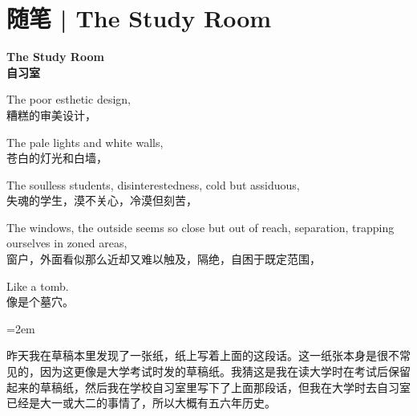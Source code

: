 \chapter{随笔 | The Study Room}






\parindent=0pt

\textbf{The Study Room\\
	自习室}

The poor esthetic design,\\
糟糕的审美设计，

The pale lights and white walls,\\
苍白的灯光和白墙，

The soulless students, disinterestedness, cold but assiduous,\\
失魂的学生，漠不关心，冷漠但刻苦，

The windows, the outside seems so close but out of reach, separation, trapping ourselves in zoned areas,\\
窗户，外面看似那么近却又难以触及，隔绝，自困于既定范围，

Like a tomb.\\
像是个墓穴。


\parindent=2em

昨天我在草稿本里发现了一张纸，纸上写着上面的这段话。这一纸张本身是很不常见的，因为这更像是大学考试时发的草稿纸。我猜这是我在读大学时在考试后保留起来的草稿纸，然后我在学校自习室里写下了上面那段话，但我在大学时去自习室已经是大一或大二的事情了，所以大概有五六年历史。


